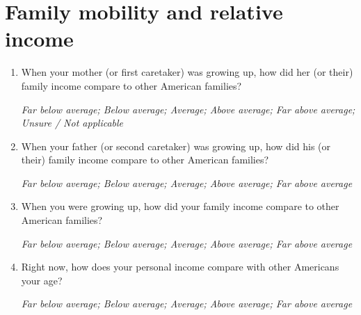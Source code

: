 \documentclass[11pt, headsepline]{article}
\begin{document}
\section*{Family mobility and relative income}

\begin{enumerate}[resume]






    \item When your mother (or first caretaker) was growing up, how did her (or their) family income compare to other American families?

    \textit{Far below average; Below average; Average; Above average; Far above average; Unsure / Not applicable}

    \item When your father (or second caretaker) was growing up, how did his (or their) family income compare to other American families?

    \textit{Far below average; Below average; Average; Above average; Far above average}

    \item When you were growing up, how did your family income compare to other American families?

    \textit{Far below average; Below average; Average; Above average; Far above average}

    \item Right now, how does your personal income compare with other Americans your age?

    \textit{Far below average; Below average; Average; Above average; Far above average}
    
\end{enumerate}
\end{document}
